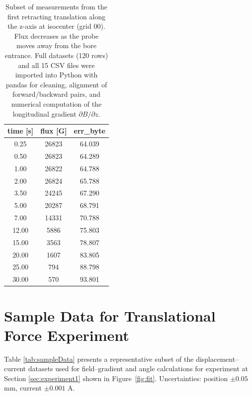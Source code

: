 \begin{table}[htbp]
	\centering
	\begin{tabular}{|c| c |c|}
		\hline
	 time [s] & flux [G] & err\_byte \\
		\hline
		0.25  & 26823 & 64.039 \\
		0.50  & 26823 & 64.289 \\
		 1.00  & 26822 & 64.788 \\
		 2.00  & 26824 & 65.788 \\
		 3.50  & 24245 & 67.290 \\
		 5.00  & 20287 & 68.791 \\
		 7.00  & 14331 & 70.788 \\
		 12.00 & 5886  & 75.803 \\
		 15.00 & 3563  & 78.807 \\
		 20.00 & 1607  & 83.805 \\
		 25.00 & 794   & 88.798 \\
		 30.00 & 570   & 93.801 \\
		\hline
	\end{tabular}
	\caption[Representative raw data – backward pass at (0,0)]{Subset of measurements from the first retracting translation along the z-axis at isocenter (grid 00). Flux decreases as the probe moves away from the bore entrance. Full datasets (120 rows) and all 15 CSV files were imported into Python with pandas for cleaning, alignment of forward/backward pairs, and numerical computation of the longitudinal gradient $\partial B / \partial z$.}
	\label{tab:sampleStrayFieldBackward}
\end{table}

\section{Sample Data for Translational Force Experiment}
\label{app:DataTrans}

Table \ref{tab:sampleData} presents a representative subset of the displacement–current datasets used for field–gradient and angle calculations for experiment at Section \ref{sec:experiment1} shown in Figure~\ref{fig:fit}. Uncertainties: position $\pm 0.05$ mm, current $\pm 0.001$ A.

